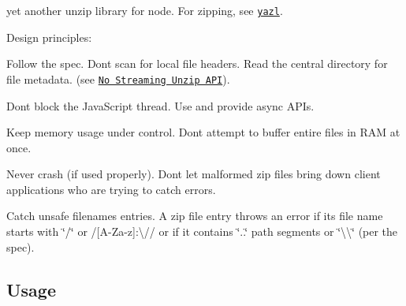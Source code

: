 \href{https://travis-ci.org/thejoshwolfe/yauzl}{\tt } \href{https://coveralls.io/r/thejoshwolfe/yauzl}{\tt }

yet another unzip library for node. For zipping, see \href{https://github.com/thejoshwolfe/yazl}{\tt yazl}.

Design principles\+:


\begin{DoxyItemize}
\item Follow the spec. Don\textquotesingle{}t scan for local file headers. Read the central directory for file metadata. (see \href{#no-streaming-unzip-api}{\tt No Streaming Unzip A\+PI}).
\item Don\textquotesingle{}t block the Java\+Script thread. Use and provide async A\+P\+Is.
\item Keep memory usage under control. Don\textquotesingle{}t attempt to buffer entire files in R\+AM at once.
\item Never crash (if used properly). Don\textquotesingle{}t let malformed zip files bring down client applications who are trying to catch errors.
\item Catch unsafe filenames entries. A zip file entry throws an error if its file name starts with {\ttfamily \char`\"{}/\char`\"{}} or {\ttfamily /\mbox{[}A-\/\+Za-\/z\mbox{]}\+:\textbackslash{}//} or if it contains {\ttfamily \char`\"{}..\char`\"{}} path segments or {\ttfamily \char`\"{}\textbackslash{}\textbackslash{}\char`\"{}} (per the spec).
\end{DoxyItemize}

\subsection*{Usage}




